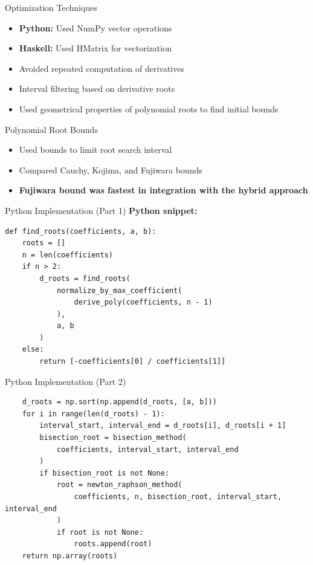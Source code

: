 \documentclass{beamer}
\begin{document}
\begin{frame}{Optimization Techniques}
\begin{itemize}
    \item \textbf{Python:} Used NumPy vector operations
    \item \textbf{Haskell:} Used HMatrix for vectorization
    \item Avoided repeated computation of derivatives
    \item Interval filtering based on derivative roots
    \item Used geometrical properties of polynomial roots to find initial bounds
\end{itemize}
\end{frame}

\begin{frame}{Polynomial Root Bounds}
\begin{itemize}
    \item Used bounds to limit root search interval
    \item Compared Cauchy, Kojima, and Fujiwara bounds
    \item \textbf{Fujiwara bound was fastest in integration with the hybrid approach}
\end{itemize}
\end{frame}

\begin{frame}[fragile]{Python Implementation (Part 1)}
\textbf{Python snippet:}
\begin{lstlisting}
def find_roots(coefficients, a, b):
    roots = []
    n = len(coefficients)
    if n > 2:
        d_roots = find_roots(
            normalize_by_max_coefficient(
                derive_poly(coefficients, n - 1)
            ),
            a, b
        )
    else:
        return [-coefficients[0] / coefficients[1]]
\end{lstlisting}
\end{frame}

\begin{frame}[fragile]{Python Implementation (Part 2)}
\begin{lstlisting}
    d_roots = np.sort(np.append(d_roots, [a, b]))
    for i in range(len(d_roots) - 1):
        interval_start, interval_end = d_roots[i], d_roots[i + 1]
        bisection_root = bisection_method(
            coefficients, interval_start, interval_end
        )
        if bisection_root is not None:
            root = newton_raphson_method(
                coefficients, n, bisection_root, interval_start, interval_end
            )
            if root is not None:
                roots.append(root)
    return np.array(roots)
\end{lstlisting}
\end{frame}
\end{document}
